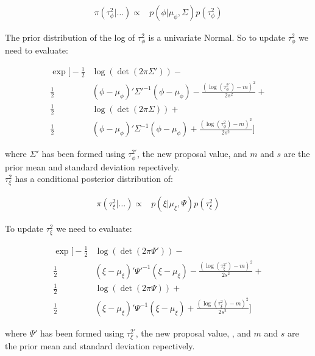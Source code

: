 \documentclass{article}
\begin{document}
\begin{align*}
\pi(\tau^2_\phi | \dots ) \propto & p(\phi | \mu_\phi, \Sigma) p(\tau^2_\phi)
\end{align*}

The prior distribution of the log of $\tau^2_\phi$ is a univariate Normal. So to update $\tau^2_\phi$ we need to evaluate:

\begin{align}
\exp \Bigg[ - \frac{1}{2} & \log(\det(2 \pi \Sigma')) - \nonumber \\
\frac{1}{2} & (\phi - \mu_\phi)' \Sigma'^{-1} (\phi - \mu_\phi) - \frac{(\log(\tau^{2'}_\phi) - m)^2}{2 s^2} + \nonumber \\
\frac{1}{2} & \log(\det(2 \pi \Sigma)) + \nonumber \\
\frac{1}{2} & (\phi - \mu_\phi)' \Sigma^{-1} (\phi - \mu_\phi) + \frac{(\log(\tau^2_\phi) - m)^2}{2 s^2} \Bigg] \label{3eq:2t1}
\end{align}

where $\Sigma'$ has been formed using $\tau^{2'}_\phi$, the new proposal value, and $m$ and $s$ are the prior mean and standard deviation repectively. \\

$\tau^2_\xi$ has a conditional posterior distribution of:

\begin{align*}
\pi(\tau^2_\xi | \dots ) \propto & p(\xi | \mu_\xi, \Psi) p(\tau^2_\xi)
\end{align*}

To update $\tau^2_\xi$ we need to evaluate:

\begin{align}
\exp \Bigg[ -\frac{1}{2} & \log(\det(2 \pi \Psi')) - \nonumber \\
\frac{1}{2} & (\xi - \mu_\xi)' \Psi'^{-1} (\xi - \mu_\xi) - \frac{(\log(\tau^{2'}_\xi) - m)^2}{2 s^2} + \nonumber \\
\frac{1}{2} & \log(\det(2 \pi \Psi)) +\nonumber \\
\frac{1}{2} & (\xi - \mu_\xi)' \Psi^{-1} (\xi - \mu_\xi) + \frac{(\log(\tau^2_\xi) - m)^2}{2 s^2} \Bigg] \label{3eq:2t2}
\end{align}

where $\Psi'$ has been formed using $\tau^{2'}_\xi$, the new proposal value, , and $m$ and $s$ are the prior mean and standard deviation repectively.
\end{document}
